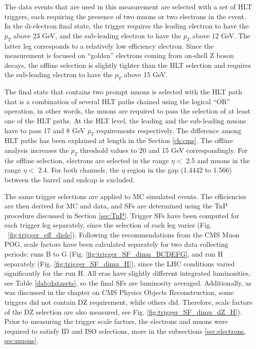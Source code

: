 The data events that are used in this measurement are selected with a set of HLT triggers, each requiring the presence of two muons or two electrons in the event. In the di-electron final state, the trigger requires the leading electron to have the $p_T$ above 23 GeV, and the sub-leading electron to have the $p_T$ above 12 GeV. The latter leg corresponds to a relatively low efficiency electron. Since the measurement is focused on ``golden'' electrons coming from on-shell Z boson decays, the offline selection is slightly tighter than the HLT selection and requires the sub-leading electron to have the $p_T$ above 15 GeV.

The final state that contains two prompt muons is selected with the HLT path that is a combination of several HLT paths chained using the logical ``OR'' operation, in other words, the muons are required to pass the selection of at least one of the HLT paths. At the HLT level, the leading and the sub-leading muons have to pass 17 and 8 GeV $p_T$ requirements respectively. The difference among HLT paths has been explained at length in the Section \ref{ch:cms}. The offline analysis increases the $p_T$ threshold values to 20 and 15 GeV correspondingly. For the offline selection, electrons are selected in the range $\eta < $ 2.5 and muons in the range $\eta < $  2.4. For both channels, the $\eta$ region in the gap (1.4442 to 1.566) between the barrel and endcap is excluded.


The same trigger selections are applied to MC simulated events. The efficiencies are then derived for MC and data, and SFs are determined using the TnP procedure discussed in Section \ref{sec:TnP}. Trigger SFs have been computed for each trigger leg separately, since the selection of each leg varies (Fig. ~\ref{fig:trigger_eff_diele}). Following the recommendations from the CMS Muon POG, scale factors have been calculated separately for two data collecting periods: runs B to G (Fig. \ref{fig:trigger_SF_dimu_BCDEFG}, and run H separately (Fig. \ref{fig:trigger_SF_dimu_H}), since the LHC conditions varied significantly for the run H. All eras have slightly different integrated luminosities, see Table \ref{dab:datasets}, so the final SFs are luminosity averaged. Additionally, as was discussed in the chapter on CMS Physics Objects Reconstruction, some triggers did not contain DZ requirement, while others did. Therefore, scale factors of the DZ selection are also measured, see Fig. \ref{fig:trigger_SF_dimu_dZ_H}). Prior to measuring the trigger scale factors, the electrons and muons were required to satisfy ID and ISO selections, more in the subsections \ref{sec:electrons, sec:muons}. 




